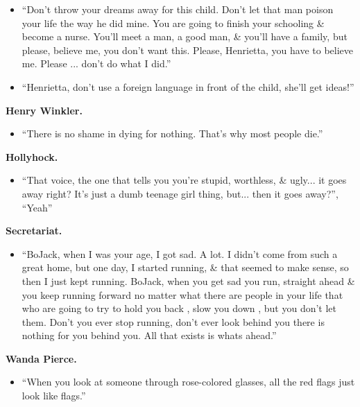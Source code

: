 \documentclass{article}
\begin{document}
\begin{enumerate}
\begin{itemize}
    	BoJack: ``... What?''

    	``It's not just you, you know. Your father \& I, we, well... you come by it honestly, the ugliness inside you. You were born broken, that's your birthright. And now you can fill your life with projects your books \& your movies \& your little girlfriends but... that won't make you whole. You're BoJack Horseman. There's no cure for that.''
    	\item ``Don't throw your dreams away for this child. Don't let that man poison your life the way he did mine. You are going to finish your schooling \& become a nurse. You'll meet a man, a good man, \& you'll have a family, but please, believe me, you don't want this. Please, Henrietta, you have to believe me. Please ... don't do what I did.''
    	\item ``Henrietta, don't use a foreign language in front of the child, she'll get ideas!''
    \end{itemize}
    {\bf Henry Winkler.}
    \begin{itemize}
    	\item ``There is no shame in dying for nothing. That's why most people die.''
    \end{itemize}
    {\bf Hollyhock.}
    \begin{itemize}
    	\item ``That voice, the one that tells you you're stupid, worthless, \& ugly... it goes away right? It's just a dumb teenage girl thing, but... then it goes away?'', ``Yeah''
    \end{itemize}
    {\bf Secretariat.}
    \begin{itemize}
    	\item ``BoJack, when I was your age, I got sad. A lot. I didn't come from such a great home, but one day, I started running, \& that seemed to make sense, so then I just kept running. BoJack, when you get sad you run, straight ahead \& you keep running forward no matter what there are people in your life that who are going to try to hold you back , slow you down , but you don't let them. Don't you ever stop running, don't ever look behind you there is nothing for you behind you. All that exists is whats ahead.''
    \end{itemize}
    {\bf Wanda Pierce.}
    \begin{itemize}
    	\item ``When you look at someone through rose-colored glasses, all the red flags just look like flags.''
    \end{itemize}

\end{enumerate}
\end{document}
